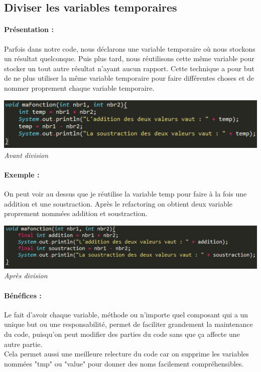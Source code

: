 \documentclass[a4paper,twoside,12pt,openright]{report}
\begin{document}
\newpage

\subsection{Diviser les variables temporaires}
\paragraph{Présentation :}
Parfois dans notre code, nous déclarons une variable temporaire où nous stockons un résultat quelconque. Puis plus tard, nous réutilisons cette même variable pour stocker un tout autre résultat n'ayant aucun rapport.
Cette technique a pour but de ne plus utiliser la même variable temporaire pour faire différentes choses et de nommer proprement chaque variable temporaire.

\begin{center}
\includegraphics[scale=1]{Image/Diviser_Temp.png}\\
\itshape{Avant division}
\end{center}

\paragraph{Exemple :}
On peut voir au dessus que je réutilise la variable temp pour faire à la fois une addition et une soustraction. Après le refactoring on obtient deux variable proprement nommées addition et soustraction.

\begin{center}
\includegraphics[scale=1]{Image/Diviser_Temp2.png}\\
\itshape{Après division}
\end{center}

\paragraph{Bénéfices :}
Le fait d'avoir chaque variable, méthode ou n'importe quel composant qui a un unique but ou une responsabilité, permet de faciliter grandement la maintenance du code, puisqu'on peut modifier des parties du code sans que ça affecte une autre partie.\\
Cela permet aussi une meilleure relecture du code car on supprime les variables nommées "tmp" ou "value" pour donner des noms facilement compréhensibles.\\
\end{document}
